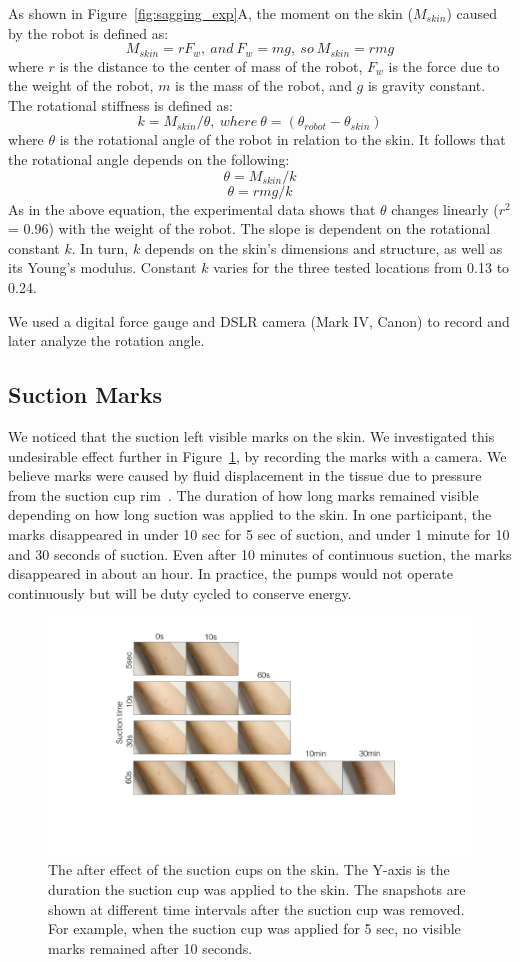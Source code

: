 As shown in Figure~\ref{fig:sagging_exp}A, the moment on the skin ($M_{skin}$) caused by the robot is defined as: 
 \[M_{skin}=rF_w,~and~F_w=mg,~so~M_{skin}=rmg\]
where $r$ is the distance to the center of mass of the robot, $F_w$ is the force due to the weight of the robot, $m$ is the mass of the robot, and $g$ is gravity constant. The rotational stiffness is defined as: 
\[k = M_{skin}/\theta,~where~ \theta = (\theta_{robot} - \theta_{skin})\]
where $\theta$ is the rotational angle of the robot in relation to the skin. It follows that the rotational angle depends on the following:  
\[\theta = M_{skin}/k \]
\[\theta = rmg/k\]
As in the above equation, the experimental data shows that $\theta$ changes linearly ($r^2$ = 0.96) with the weight of the robot. The slope is dependent on the rotational constant $k$. In turn, $k$ depends on the skin's dimensions and structure, as well as its Young's modulus. Constant $k$ varies for the three tested locations from 0.13 to 0.24. 

We used a digital force gauge and DSLR camera (Mark IV, Canon) to record and later analyze the rotation angle. 

\subsection{Suction Marks}
We noticed that the suction left visible marks on the skin. We investigated this undesirable effect further in Figure~\ref{fig:arm_effect}, by recording the marks with a camera. We believe marks were caused by fluid displacement in the tissue due to pressure from the suction cup rim~\cite{lanir1990vivo}. The duration of how long marks remained visible depending on how long suction was applied to the skin. In one participant, the marks disappeared in under 10 sec for 5 sec of suction, and under 1 minute for 10 and 30 seconds of suction. Even after 10 minutes of continuous suction, the marks disappeared in about an hour. In practice, the pumps would not operate continuously but will be duty cycled to conserve energy. 

\begin{figure}[!t]
\centering
\includegraphics[width=12.0cm]{pictures/chapter3/arm_effect.pdf}
\caption{The after effect of the suction cups on the skin. The Y-axis is the duration the suction cup was applied to the skin. The snapshots are shown at different time intervals after the suction cup was removed. For example, when the suction cup was applied for 5 sec, no visible marks remained after 10 seconds.}
\label{fig:arm_effect}
\end{figure}

